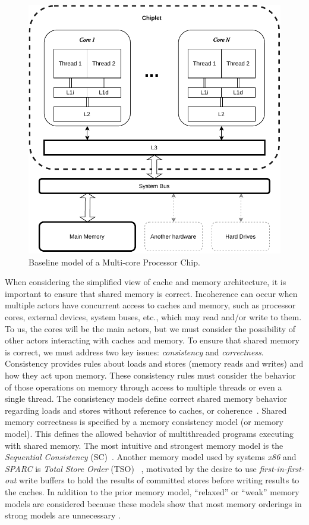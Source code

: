 \begin{figure}[ht!]
    \centering
    \includegraphics[width=0.7\linewidth]{contents//figures/III_2_cpu.pdf}
    \caption{Baseline model of a Multi-core Processor Chip.}
    \label{fig:multi-core-processor}
\end{figure}

When considering the simplified view of cache and memory architecture, it is important to ensure that shared memory is correct. Incoherence can occur when multiple actors have concurrent access to caches and memory, such as processor cores, external devices, system buses, etc., which may read and/or write to them. To us, the cores will be the main actors, but we must consider the possibility of other actors interacting with caches and memory.
To ensure that shared memory is correct, we must address two key issues: \emph{consistency} and \emph{correctness}. Consistency provides rules about loads and stores (memory reads and writes) and how they act upon memory. These consistency rules must consider the behavior of those operations on memory through access to multiple threads or even a single thread. The consistency models define correct shared memory behavior regarding loads and stores without reference to caches, or coherence~\cite{DBLP_series_synthesis_2020Nagarajan}. Shared memory correctness is specified by a memory consistency model (or memory model). This defines the allowed behavior of multithreaded programs executing with shared memory. The most intuitive and strongest memory model is the \emph{Sequential Consistency} (SC)~\cite{lamport1979how}. Another memory model used by systems \emph{x86} and \emph{SPARC} is \emph{Total Store Order} (TSO) ~\cite{DBLP_conf_tphol_OwensSS09, DBLP_journals_cacm_SewellSONM10, sparc1992sparc}, motivated by the desire to use \emph{first-in-first-out} write buffers to hold the results of committed stores before writing results to the caches.  In addition to the prior memory model, ``relaxed'' or ``weak'' memory models are considered because these models show that most memory orderings in strong models are unnecessary \cite{DBLP_series_synthesis_2020Nagarajan}.

